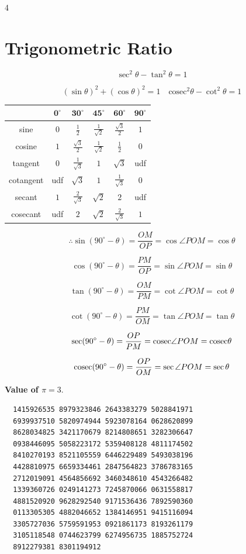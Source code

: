 \begin{multicols*}{4}
\section*{Trigonometric Ratio}

\[
\sec^2\theta - \tan^2\theta = 1
\]

\[
(\sin \theta)^2 + (\cos \theta)^2 = 1 \quad \text{cosec}^2\theta - \cot^2\theta = 1
\]

\begin{center}
\begin{tabular}{|c|c|c|c|c|c|}
\hline
\textbf{} & $\mathbf{0^\circ}$ & $\mathbf{30^\circ}$ & $\mathbf{45^\circ}$ & $\mathbf{60^\circ}$ & $\mathbf{90^\circ}$ \\
\hline
sine & $0$ & $\frac{1}{2}$ & $\frac{1}{\sqrt{2}}$ & $\frac{\sqrt{3}}{2}$ & $1$ \\
\hline
cosine & $1$ & $\frac{\sqrt{3}}{2}$ & $\frac{1}{\sqrt{2}}$ & $\frac{1}{2}$ & $0$ \\
\hline
tangent & $0$ & $\frac{1}{\sqrt{3}}$ & $1$ & $\sqrt{3}$ & udf \\
\hline
cotangent & udf & $\sqrt{3}$ & $1$ & $\frac{1}{\sqrt{3}}$ & $0$ \\
\hline
secant & $1$ & $\frac{2}{\sqrt{3}}$ & $\sqrt{2}$ & $2$ & udf \\
\hline
cosecant & udf & $2$ & $\sqrt{2}$ & $\frac{2}{\sqrt{3}}$ & $1$ \\
\hline
\end{tabular}
\end{center}

\[
\therefore \sin(90^\circ - \theta) = \frac{OM}{OP} = \cos\angle POM = \cos\theta
\]

\[
\cos(90^\circ - \theta) = \frac{PM}{OP} = \sin\angle POM = \sin\theta
\]

\[
\tan(90^\circ - \theta) = \frac{OM}{PM} = \cot\angle POM = \cot\theta
\]

\[
\cot(90^\circ - \theta) = \frac{PM}{OM} = \tan\angle POM = \tan\theta
\]

\[
\sec(90^\circ - \theta) = \frac{OP}{PM} = \text{cosec}\angle POM = \text{cosec}\theta
\]

\[
\text{cosec}(90^\circ - \theta) = \frac{OP}{OM} = \sec\angle POM = \sec\theta
\]

\textbf{Value of $\pi = 3.$}

\begin{verbatim}
  1415926535 8979323846 2643383279 5028841971
  6939937510 5820974944 5923078164 0628620899
  8628034825 3421170679 8214808651 3282306647 
  0938446095 5058223172 5359408128 4811174502
  8410270193 8521105559 6446229489 5493038196
  4428810975 6659334461 2847564823 3786783165
  2712019091 4564856692 3460348610 4543266482
  1339360726 0249141273 7245870066 0631558817
  4881520920 9628292540 9171536436 7892590360
  0113305305 4882046652 1384146951 9415116094
  3305727036 5759591953 0921861173 8193261179
  3105118548 0744623799 6274956735 1885752724 
  8912279381 8301194912
\end{verbatim}


\end{multicols*}
